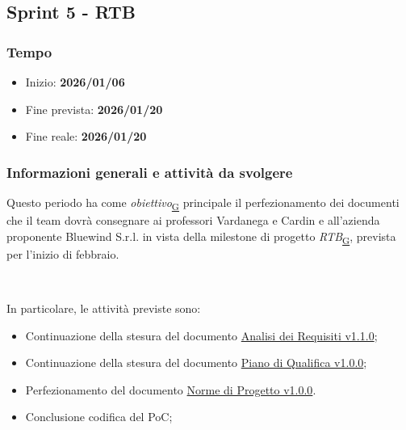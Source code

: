 \documentclass[a4paper,12pt]{article}
\begin{document}
    \subsection{Sprint 5 - RTB}{
        \subsubsection{Tempo}{
            \begin{itemize}
                \item[] Inizio: \textbf{2026/01/06} 
                \item[] Fine prevista: \textbf{2026/01/20} 
                \item[] Fine reale: \textbf{2026/01/20} 
            \end{itemize}
        }
    \subsubsection{Informazioni generali e attività da svolgere}{
            Questo periodo ha come \textit{obiettivo}\textsubscript{\href{https://atlasteam9.github.io/Atlas/glossario.html\#Obiettivo}{G}} principale il perfezionamento dei documenti che il team dovrà consegnare ai professori Vardanega e Cardin e all'azienda proponente Bluewind S.r.l. in vista della milestone di progetto \textit{RTB}\textsubscript{\href{https://atlasteam9.github.io/Atlas/glossario.html\#RTB}{G}}, prevista per l'inizio di febbraio.
            }
            
            \
            
    \noindent In particolare, le attività previste sono:
            \begin{itemize}
                \item Continuazione della stesura del documento \href{https://atlasteam9.github.io/Atlas/docs/RTB/documenti/esterni/Analisi%20dei%20Requisiti.pdf}{Analisi dei Requisiti v1.1.0};
                \item Continuazione della stesura del documento \href{https://atlasteam9.github.io/Atlas/docs/RTB/documenti/esterni/Piano%20di%20Qualifica.pdf}{Piano di Qualifica v1.0.0};
                \item Perfezionamento del documento \href{https://atlasteam9.github.io/Atlas/docs/RTB/documenti/interni/Norme%20di%20Progetto.pdf}{Norme di Progetto v1.0.0}.
                \item Conclusione codifica del PoC;
            \end{itemize}
        }
\end{document}
